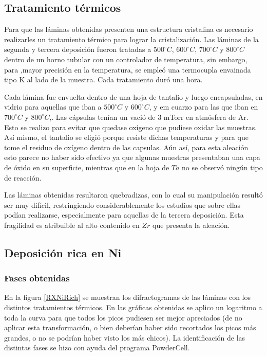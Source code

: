 \documentclass[12pt]{article}
\theoremstyle{definition}
\theoremstyle{remark}
\begin{document}
\subsection{Tratamiento térmicos}
Para que las láminas obtenidas presenten una estructura cristalina es necesario realizarles un tratamiento térmico para lograr la cristalización. Las láminas de la segunda y tercera deposición fueron tratadas a $500 ^\circ C$, $600 ^\circ C$, $700 ^\circ C$ y $800 ^\circ C$ dentro de un horno tubular con un controlador de temperatura, sin embargo, para ,mayor precisión en la temperatura, se empleó una termocupla envainada tipo K al lado de la muestra. Cada tratamiento duró una hora.

Cada lámina fue envuelta dentro de una hoja de tantalio y luego encapsuladas, en vidrio para aquellas que iban a $500 ^\circ C$ y $600 ^\circ C$, y em cuarzo para las que iban en $700 ^\circ C$ y $800 ^\circ C$,. Las cápsulas tenían un vació de 3 mTorr en atmósfera de Ar. Esto se realizo para evitar que quedase oxígeno que pudiese oxidar las muestras. Así mismo, el tantalio se eligió porque resiste dichas temperaturas y para que tome el residuo de oxígeno dentro de las capsulas. Aún así, para esta aleación esto parece no haber sido efectivo ya que algunas muestras presentaban una capa de óxido en su superficie, mientras que en la hoja de $Ta$ no se observó ningún tipo de reacción.

Las láminas obtenidas resultaron quebradizas, con lo cual su manipulación resultó ser muy difícil, restringiendo considerablemente los estudios que sobre ellas podían realizarse, especialmente para aquellas de la tercera deposición. Esta fragilidad es atribuible al alto contenido en $Zr$ que presenta la aleación. 

\subsection{Deposición rica en Ni}
\subsubsection{Fases obtenidas}
En la figura \ref{RXNiRich} se muestran los difractogramas de las láminas con los distintos tratamientos térmicos. En las gráficas obtenidas se aplico un logaritmo a toda la curva para que todos los picos pudiesen ser mejor apreciados (de no aplicar esta transformación, o bien deberían haber sido recortados los picos más grandes, o no se podrían haber visto los más chicos). La identificación de las distintas fases se hizo con ayuda del programa PowderCell.
\end{document}
